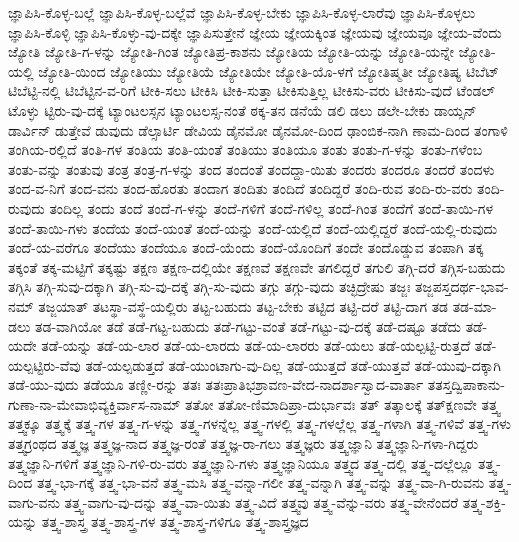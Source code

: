 {ಜ್ಞಾಪಿಸಿ-ಕೊಳ್ಳ-ಬಲ್ಲೆ
ಜ್ಞಾಪಿಸಿ-ಕೊಳ್ಳ-ಬಲ್ಲೆವೆ
ಜ್ಞಾಪಿಸಿ-ಕೊಳ್ಳ-ಬೇಕು
ಜ್ಞಾಪಿಸಿ-ಕೊಳ್ಳ-ಲಾರೆವು
ಜ್ಞಾಪಿಸಿ-ಕೊಳ್ಳಲು
ಜ್ಞಾಪಿಸಿ-ಕೊಳ್ಳಿ
ಜ್ಞಾಪಿಸಿ-ಕೊಳ್ಳು-ವು-ದಕ್ಕೇ
ಜ್ಞಾಪಿಸುತ್ತೇನೆ
ಜ್ಞೇಯ
ಜ್ಞೇಯಕ್ಕಿಂತ
ಜ್ಞೇಯವು
ಜ್ಞೇಯವೂ
ಜ್ಞೇಯ-ವೆಂದು
ಜ್ಯೋತಿ
ಜ್ಯೋತಿ-ಗ-ಳನ್ನು
ಜ್ಯೋತಿ-ಗಿಂತ
ಜ್ಯೋತಿಪ್ರ-ಕಾಶನು
ಜ್ಯೋತಿಯ
ಜ್ಯೋತಿ-ಯನ್ನು
ಜ್ಯೋತಿ-ಯನ್ನೇ
ಜ್ಯೋತಿ-ಯಲ್ಲಿ
ಜ್ಯೋತಿ-ಯಿಂದ
ಜ್ಯೋತಿಯು
ಜ್ಯೋತಿಯೆ
ಜ್ಯೋತಿಯೇ
ಜ್ಯೋತಿ-ಯೊ-ಳಗೆ
ಜ್ಯೋತಿಷ್ಮತೀ
ಜ್ಯೋತಿಷ್ಯ
ಟಿಬೆಟ್
ಟಿಬೆಟ್ಟಿ-ನಲ್ಲಿ
ಟಿಬೆಟ್ಟಿನ-ವ-ರಿಗೆ
ಟೀಕಿ-ಸಲು
ಟೀಕಿಸಿ
ಟೀಕಿ-ಸುತ್ತಾ
ಟೀಕಿಸುತ್ತಿಲ್ಲ
ಟೀಕಿಸು-ವರು
ಟೀಕಿಸು-ವುದೆ
ಟೆಂಡಲ್
ಟೊಳ್ಳು
ಟ್ಟಿರು-ವು-ದಕ್ಕೆ
ಟ್ಯಾಂಟಲಸ್ಸನ
ಟ್ಯಾಂಟಲಸ್ಸ-ನಂತೆ
ಠಕ್ಕ-ತನ
ಡನೆಯೆ
ಡಲಿ
ಡಲು
ಡಲೇ-ಬೇಕು
ಡಾಯ್ಸನ್
ಡಾರ್ವಿನ್
ಡುತ್ತೇವೆ
ಡುವುದು
ಡೆಲ್ಸಾರ್ಟಿ
ಡೇವಿಯ
ಡೈನಮೋ
ಡೈನಮೋ-ದಿಂದ
ಢಾಂಬಿಕ-ನಾಗಿ
ಣಾಮ-ದಿಂದ
ತಂಗಾಳಿ
ತಂಗಿಯ-ರಲ್ಲಿದೆ
ತಂತಿ-ಗಳ
ತಂತಿಯ
ತಂತಿ-ಯಂತೆ
ತಂತಿಯು
ತಂತಿಯೂ
ತಂತು
ತಂತು-ಗ-ಳನ್ನು
ತಂತು-ಗಳೆಂಬ
ತಂತು-ವನ್ನು
ತಂತುವು
ತಂತ್ರ
ತಂತ್ರ-ಗ-ಳನ್ನು
ತಂದ
ತಂದಂತೆ
ತಂದದ್ದಾ-ಯಿತು
ತಂದರು
ತಂದರೂ
ತಂದರೆ
ತಂದಳು
ತಂದ-ವ-ನಿಗೆ
ತಂದ-ವನು
ತಂದ-ಹೊರತು
ತಂದಾಗ
ತಂದಿತು
ತಂದಿದೆ
ತಂದಿದ್ದರೆ
ತಂದಿ-ರುವ
ತಂದಿ-ರು-ವರು
ತಂದಿ-ರುವುದು
ತಂದಿಲ್ಲ
ತಂದು
ತಂದೆ
ತಂದೆ-ಗ-ಳನ್ನು
ತಂದೆ-ಗಳಿಗೆ
ತಂದೆ-ಗಳಿಲ್ಲ
ತಂದೆ-ಗಿಂತ
ತಂದೆಗೆ
ತಂದೆ-ತಾಯಿ-ಗಳ
ತಂದೆ-ತಾಯಿ-ಗಳು
ತಂದೆಯ
ತಂದೆ-ಯಂತೆ
ತಂದೆ-ಯನ್ನು
ತಂದೆ-ಯಲ್ಲಿದೆ
ತಂದೆ-ಯಲ್ಲಿದ್ದರೆ
ತಂದೆ-ಯಲ್ಲಿ-ರುವುದು
ತಂದೆ-ಯ-ವರೆಗೂ
ತಂದೆಯು
ತಂದೆಯೂ
ತಂದೆ-ಯೆಂದು
ತಂದೆ-ಯೊಂದಿಗೆ
ತಂದೇ
ತಂದೊಡ್ಡುವ
ತಂಪಾಗಿ
ತಕ್ಕ
ತಕ್ಕಂತೆ
ತಕ್ಕ-ಮಟ್ಟಿಗೆ
ತಕ್ಕಷ್ಟು
ತಕ್ಷಣ
ತಕ್ಷಣ-ದಲ್ಲಿಯೇ
ತಕ್ಷಣವೆ
ತಕ್ಷಣವೇ
ತಗಲಿದ್ದರೆ
ತಗುಲಿ
ತಗ್ಗಿ-ದರೆ
ತಗ್ಗಿಸ-ಬಹುದು
ತಗ್ಗಿಸಿ
ತಗ್ಗಿ-ಸುವು-ದಕ್ಕಾಗಿ
ತಗ್ಗಿ-ಸು-ವು-ದಕ್ಕೆ
ತಗ್ಗಿ-ಸು-ವುದು
ತಗ್ಗು
ತಗ್ಗು-ವುದು
ತಚ್ಛಿದ್ರೇಷು
ತಜ್ಜಃ
ತಜ್ಜಪಸ್ತದರ್ಥ-ಭಾವ-ನಮ್
ತಜ್ಜಯಾತ್
ತಟಸ್ಥಾ-ವಸ್ಥೆ-ಯಲ್ಲಿರು
ತಟ್ಟ-ಬಹುದು
ತಟ್ಟ-ಬೇಕು
ತಟ್ಟಿದ
ತಟ್ಟಿ-ದರೆ
ತಟ್ಟಿ-ದಾಗ
ತಡ
ತಡ-ಮಾ-ಡಲು
ತಡ-ವಾಗಿಯೋ
ತಡೆ
ತಡೆ-ಗಟ್ಟ-ಬಹುದು
ತಡೆ-ಗಟ್ಟು-ವಂತೆ
ತಡೆ-ಗಟ್ಟು-ವು-ದಕ್ಕೆ
ತಡೆ-ದಷ್ಟೂ
ತಡೆದು
ತಡೆ-ಯದೇ
ತಡೆ-ಯನ್ನು
ತಡೆ-ಯ-ಲಾರ
ತಡೆ-ಯ-ಲಾರದು
ತಡೆ-ಯ-ಲಾರರು
ತಡೆ-ಯಲು
ತಡೆ-ಯಲ್ಪಟ್ಟಿ-ರುತ್ತದೆ
ತಡೆ-ಯಲ್ಪಟ್ಟಿರು-ವೆವು
ತಡೆ-ಯಲ್ಪಡುತ್ತದೆ
ತಡೆ-ಯುಂಟಾಗು-ವು-ದಿಲ್ಲ
ತಡೆ-ಯುತ್ತದೆ
ತಡೆ-ಯುತ್ತವೆ
ತಡೆ-ಯುವು-ದಕ್ಕಾಗಿ
ತಡೆ-ಯು-ವುದು
ತಡೆಯೂ
ತಣ್ಣೀ-ರನ್ನು
ತತಃ
ತತಃಪ್ರಾತಿಭಶ್ರಾವಣ-ವೇದ-ನಾದರ್ಶಾಸ್ವಾದ-ವಾರ್ತಾ
ತತಸ್ತದ್ವಿಪಾಕಾನು-ಗುಣಾ-ನಾ-ಮೇವಾಭಿವ್ಯಕ್ತಿರ್ವಾಸ-ನಾಮ್
ತತೋ
ತತೋ-ಣಿಮಾದಿಪ್ರಾ-ದುರ್ಭಾವಃ
ತತ್
ತತ್ಕಾಲಕ್ಕೆ
ತತ್ಕ್ಷಣವೇ
ತತ್ತ್ವ
ತತ್ತ್ವಕ್ಕೂ
ತತ್ತ್ವಕ್ಕೆ
ತತ್ತ್ವ-ಗಳ
ತತ್ತ್ವ-ಗ-ಳನ್ನು
ತತ್ತ್ವ-ಗಳನ್ನೆಲ್ಲ
ತತ್ತ್ವ-ಗಳಲ್ಲಿ
ತತ್ತ್ವ-ಗಳಲ್ಲೆಲ್ಲ
ತತ್ತ್ವ-ಗಳಾಗಿ
ತತ್ತ್ವ-ಗಳಿವೆ
ತತ್ತ್ವ-ಗಳು
ತತ್ತ್ವಗ್ರಂಥದ
ತತ್ತ್ವಜ್ಞ
ತತ್ತ್ವಜ್ಞ-ನಾದ
ತತ್ತ್ವಜ್ಞ-ರಂತೆ
ತತ್ತ್ವಜ್ಞ-ರಾ-ಗಲು
ತತ್ತ್ವಜ್ಞರು
ತತ್ತ್ವಜ್ಞಾನಿ
ತತ್ತ್ವಜ್ಞಾನಿ-ಗಳಾ-ಗಿದ್ದರು
ತತ್ತ್ವಜ್ಞಾನಿ-ಗಳಿಗೆ
ತತ್ತ್ವಜ್ಞಾನಿ-ಗಳಿ-ರು-ವರು
ತತ್ತ್ವಜ್ಞಾನಿ-ಗಳು
ತತ್ತ್ವಜ್ಞಾನಿಯೂ
ತತ್ತ್ವದ
ತತ್ತ್ವ-ದಲ್ಲಿ
ತತ್ತ್ವ-ದಲ್ಲೆಲ್ಲೂ
ತತ್ತ್ವ-ದಿಂದ
ತತ್ತ್ವ-ಭಾ-ಗಕ್ಕೆ
ತತ್ತ್ವ-ಭಾ-ವನೆ
ತತ್ತ್ವ-ಮಸಿ
ತತ್ತ್ವ-ವನ್ನಾ-ಗಲೀ
ತತ್ತ್ವ-ವನ್ನಾಗಿ
ತತ್ತ್ವ-ವನ್ನು
ತತ್ತ್ವ-ವಾ-ಗಿ-ರುವನು
ತತ್ತ್ವ-ವಾಗು-ವನು
ತತ್ತ್ವ-ವಾಗು-ವು-ದನ್ನು
ತತ್ತ್ವ-ವಾ-ಯಿತು
ತತ್ತ್ವ-ವಿದೆ
ತತ್ತ್ವವು
ತತ್ತ್ವ-ವೆನ್ನು-ವರು
ತತ್ತ್ವ-ವೇನೆಂದರೆ
ತತ್ತ್ವ-ಶಕ್ತಿ-ಯನ್ನು
ತತ್ತ್ವ-ಶಾಸ್ತ್ರ
ತತ್ತ್ವ-ಶಾಸ್ತ್ರ-ಗಳ
ತತ್ತ್ವ-ಶಾಸ್ತ್ರ-ಗಳಿಗೂ
ತತ್ತ್ವ-ಶಾಸ್ತ್ರಜ್ಞದ
}
